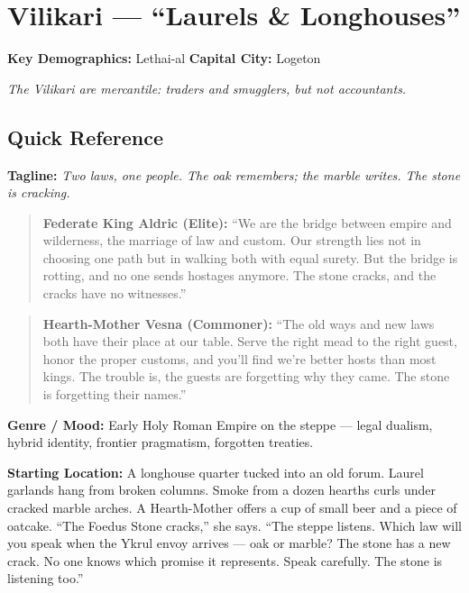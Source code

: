 \section{Vilikari --- ``Laurels \& Longhouses''}
\label{chap:vilikari}

\textbf{Key Demographics: } Lethai-al
\textbf{Capital City: } Logeton

\noindent\textit{The Vilikari are mercantile: traders and smugglers, but not accountants.}

\subsection*{Quick Reference}

\textbf{Tagline:} \textit{Two laws, one people. The oak remembers; the marble writes. The stone is cracking.}

\begin{quote}
  \textbf{Federate King Aldric (Elite):}  
  ``We are the bridge between empire and wilderness, the marriage of law and custom. Our strength lies not in choosing one path but in walking both with equal surety. But the bridge is rotting, and no one sends hostages anymore. The stone cracks, and the cracks have no witnesses.''
\end{quote}

\begin{quote}
  \textbf{Hearth-Mother Vesna (Commoner):}  
  ``The old ways and new laws both have their place at our table. Serve the right mead to the right guest, honor the proper customs, and you'll find we're better hosts than most kings. The trouble is, the guests are forgetting why they came. The stone is forgetting their names.''
\end{quote}

\noindent\textbf{Genre / Mood:} Early Holy Roman Empire on the steppe --- legal dualism, hybrid identity, frontier pragmatism, forgotten treaties.

\noindent\textbf{Starting Location:} A longhouse quarter tucked into an old forum. Laurel garlands hang from broken columns. Smoke from a dozen hearths curls under cracked marble arches. A Hearth-Mother offers a cup of small beer and a piece of oatcake. ``The Foedus Stone cracks,'' she says. ``The steppe listens. Which law will you speak when the Ykrul envoy arrives --- oak or marble? The stone has a new crack. No one knows which promise it represents. Speak carefully. The stone is listening too.''

